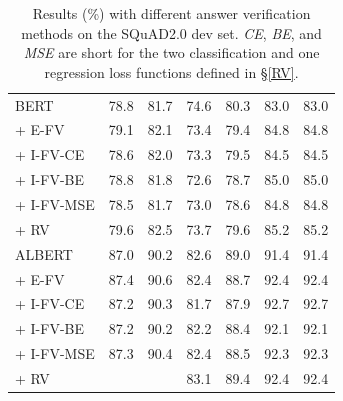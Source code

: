 \documentclass[letterpaper]{article} %
\begin{document}
\begin{table}
\begin{center}
{\begin{tabular}{lllllll}
				\midrule
				BERT  & 78.8 & 81.7  & 74.6 & 80.3 & 83.0 & 83.0 \\
				\quad     + E-FV  & 79.1 & 82.1 & 73.4 & 79.4  & 84.8 & 84.8  \\
				\quad     + I-FV-CE  & 78.6 & 82.0 & 73.3 & 79.5 & 84.5 & 84.5\\
				\quad + I-FV-BE & 78.8 & 81.8 & 72.6 & 78.7 & 85.0 & 85.0\\
				\quad     + I-FV-MSE  & 78.5 & 81.7& 73.0 & 78.6 & 84.8 & 84.8  \\
				\quad     + RV  & 79.6 & 82.5 & 73.7 & 79.6  & 85.2 & 85.2  \\
				\midrule
				ALBERT  &  87.0 & 90.2 & 82.6 & 89.0 & 91.4 &  91.4  \\
				\quad     + E-FV  & 87.4 & 90.6  & 82.4 & 88.7  & 92.4 &  92.4\\
				\quad   + I-FV-CE  & 87.2 & 90.3 & 81.7 & 87.9 & 92.7 & 92.7 \\
				\quad + I-FV-BE & 87.2 & 90.2 &82.2 &88.4 &92.1 &92.1 \\
				\quad     + I-FV-MSE & 87.3 & 90.4 & 82.4 & 88.5 & 92.3 & 92.3 \\
				\quad      + RV  & \text{87.8} & \text{90.9}  & 83.1 & 89.4 &92.4  &  92.4 \\
				\bottomrule
			\end{tabular}
		}
	\end{center}
	\caption{\label{tablescore} Results (\%) with different answer verification methods on the SQuAD2.0 dev set. \textit{CE}, \textit{BE}, and \textit{MSE} are short for the two classification and one regression loss functions defined in \S\ref{RV}.}
\end{table}
\end{document}
